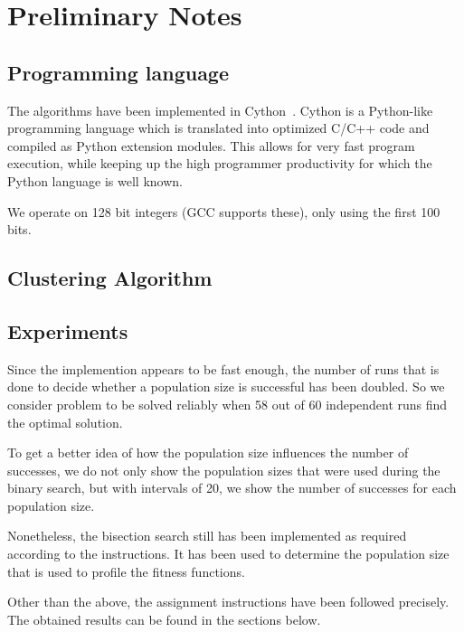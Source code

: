 \documentclass[12pt]{article}
\theoremstyle{definition}
\begin{document}
\maketitle

\section*{Preliminary Notes}

\subsection*{Programming language}
The algorithms have been implemented in Cython~\cite{cython}.
Cython is a Python-like programming language which is translated into optimized
C/C++ code and compiled as Python extension modules.
This allows for very fast program execution, while keeping up the high programmer
productivity for which the Python language is well known.

We operate on 128 bit integers (GCC supports these), only using the first 100 bits.

\subsection*{Clustering Algorithm}

\subsection*{Experiments}
Since the implemention appears to be fast enough, the number of runs that is done to decide whether a population size is successful has been doubled.
So we consider problem to be solved reliably when 58 out of 60 independent runs find the optimal solution.

To get a better idea of how the population size influences the number of successes, we do not only show the population sizes that were used during the binary search, but with intervals of 20, we show the number of successes for each population size.

Nonetheless, the bisection search still has been implemented as required according to the instructions.
It has been used to determine the population size that is used to profile the fitness functions.

Other than the above, the assignment instructions have been followed precisely.
The obtained results can be found in the sections below.
\end{document}
